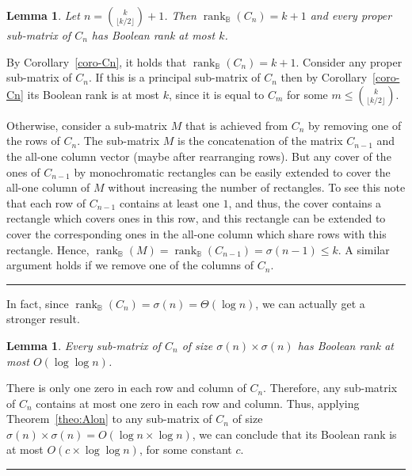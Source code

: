 \documentclass[11pt]{article}
\newtheorem{lemma}[theorem]{Lemma}
\newcommand{\qedsymb}{\hfill{\rule{2mm}{2mm}}}
\renewenvironment{proof}[1][]{\begin{trivlist}
\item[\hspace{\labelsep}{\bf\noindent Proof#1:\/}] }{\qedsymb\end{trivlist}}
\newcommand{\rank}{\mathop{\mathrm{rank}}}
\newcommand{\Rbool}{{\rank}_\mathbb{B}}
\begin{document}
\begin{lemma}
\label{lem:crown}
Let $ n =  {k \choose \lfloor k/2\rfloor} + 1$.
Then $\Rbool(C_n) = k+1$ and every proper sub-matrix of $C_n$ has Boolean rank at most $k$.
\end{lemma}
\begin{proof}
By Corollary~\ref{coro-Cn}, it holds that $\Rbool(C_n) = k+1$.
Consider any proper sub-matrix of $C_n$.
If this is a principal sub-matrix of $C_n$ then by Corollary~\ref{coro-Cn} its Boolean rank is at most $k$,
since it is equal to $C_m$ for some  $m \leq {k \choose \lfloor k/2\rfloor}$.

Otherwise, consider a sub-matrix $M$ that is achieved from $C_n$ by removing one of the rows of $C_n$.
The sub-matrix $M$ is the concatenation of the matrix $C_{n-1}$ and the all-one column vector (maybe after rearranging rows).
But any cover of the ones of $C_{n-1}$ by monochromatic rectangles can be easily extended to cover
the all-one column of $M$ without increasing the number of rectangles.
To see this note that each row of $C_{n-1}$ contains at least one $1$, and thus,
the cover contains a rectangle which covers ones in this row, and this rectangle can be extended to cover the corresponding ones in the all-one column which share rows with this rectangle.
Hence, $\Rbool(M) = \Rbool(C_{n-1}) = \sigma(n-1) \leq k$.
A similar argument holds if we remove one of the columns of $C_n$.
\end{proof}

In fact, since $\Rbool(C_n) = \sigma(n) = \Theta(\log n)$, we can actually get a stronger result.

\begin{lemma}
\label{lem:submatrixCn}
Every sub-matrix of $C_n$ of size $ \sigma(n) \times  \sigma(n)$ has Boolean rank at most $O(\log \log n)$.
\end{lemma}
\begin{proof}
There is only one zero in each row and column of $C_n$. Therefore, any sub-matrix of $C_n$ contains at most one zero in each row and column.
Thus, applying Theorem~\ref{theo:Alon} to any sub-matrix of $C_n$ of size $\sigma(n) \times \sigma(n) = O(\log n \times \log n)$,
we can conclude that its Boolean rank is at most $O(c\times \log \log n)$, for some constant $c$.
\end{proof}
\end{document}
